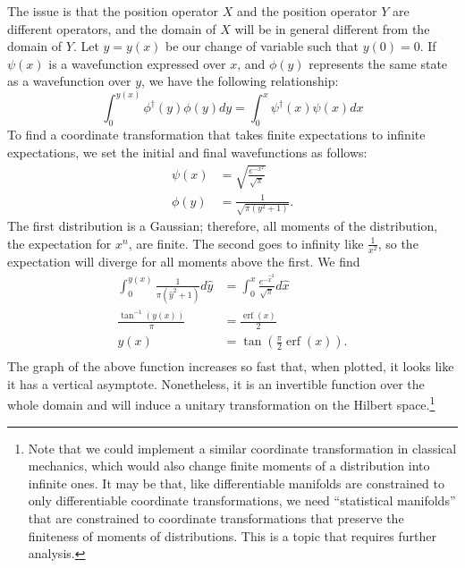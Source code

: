 \documentclass[10pt,twocolumn, nofootinbib]{revtex4-2}
\DeclareMathOperator{\erf}{erf}
\begin{document}
The issue is that the position operator $X$ and the position operator $Y$ are different operators, and the domain of $X$ will be in general different from the domain of $Y$. Let $y=y(x)$ be our change of variable such that $y(0) = 0$. If $\psi(x)$ is a wavefunction expressed over $x$, and $\phi(y)$ represents the same state as a wavefunction over $y$, we have the following relationship:
\begin{equation}
\int_{0}^{y(x)} \phi^\dagger(y) \phi(y) dy = \int_{0}^{x} \psi^\dagger(x) \psi(x) dx
\end{equation}
To find a coordinate transformation that takes finite expectations to infinite expectations, we set the initial and final wavefunctions as follows:
\begin{align}
\psi(x) &= \sqrt{\frac{e^{-x^2}}{\sqrt{\pi}}} \\
\phi(y) &= \frac{1}{\sqrt{\pi(y^2 + 1)}}.
\end{align}
The first distribution is a Gaussian; therefore, all moments of the distribution, the expectation for $x^n$, are finite. The second goes to infinity like $\frac{1}{x^2}$, so the expectation will diverge for all moments above the first. We find
\begin{equation}
\begin{aligned}
\int_{0}^{y(x)} \frac{1}{\pi(\hat{y}^2 + 1)} d\hat{y} &= \int_{0}^{x} \frac{e^{-\hat{x}^2}}{\sqrt{\pi}} d\hat{x} \\
\frac{\tan^{-1}(y(x))}{\pi} &= \frac{\erf(x)}{2} \\
y(x) &= \tan \left(\frac{\pi}{2}\erf(x)\right). \\
\end{aligned}
\end{equation}
The graph of the above function increases so fast that, when plotted, it looks like it has a vertical asymptote. Nonetheless, it is an invertible function over the whole domain and will induce a unitary transformation on the Hilbert space.\footnote{Note that we could implement a similar coordinate transformation in classical mechanics, which would also change finite moments of a distribution into infinite ones. It may be that, like differentiable manifolds are constrained to only differentiable coordinate transformations, we need ``statistical manifolds'' that are constrained to coordinate transformations that preserve the finiteness of moments of distributions. This is a topic that requires further analysis.}
\end{document}
